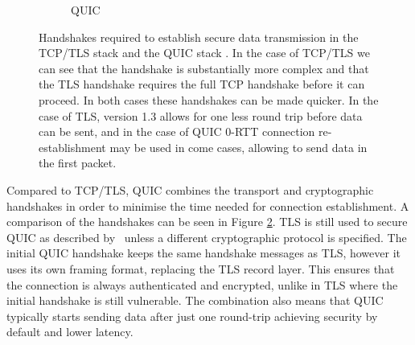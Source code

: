\begin{figure}[ht]
\begin{center}
\begin{subfigure}[b]{0.45\textwidth}
            \caption{QUIC}
            \label{fig:handshakes:quic}
        \end{subfigure}
        \caption{Handshakes required to establish secure data transmission in the TCP/TLS stack  and the QUIC stack . In the case of TCP/TLS we can see that the handshake is substantially more complex and that the TLS handshake requires the full TCP handshake before it can proceed. In both cases these handshakes can be made quicker. In the case of TLS, version 1.3 allows for one less round trip before data can be sent, and in the case of QUIC 0-RTT connection re-establishment may be used in come cases, allowing to send data in the first packet.}
        \label{fig:handshakes_comparison}
    \end{center}
\end{figure}

Compared to TCP/TLS, QUIC combines the transport and cryptographic handshakes in order to minimise the time needed for connection establishment.
A comparison of the handshakes can be seen in Figure \ref{fig:handshakes_comparison}.
TLS is still used to secure QUIC as described by~\citet{thomson_using_2021} unless a different cryptographic protocol is specified.
The initial QUIC handshake keeps the same handshake messages as TLS, however it uses its own framing format, replacing the TLS record layer.
This ensures that the connection is always authenticated and encrypted, unlike in TLS where the initial handshake is still vulnerable.
The combination also means that QUIC typically starts sending data after just one round-trip achieving security by default and lower latency.
